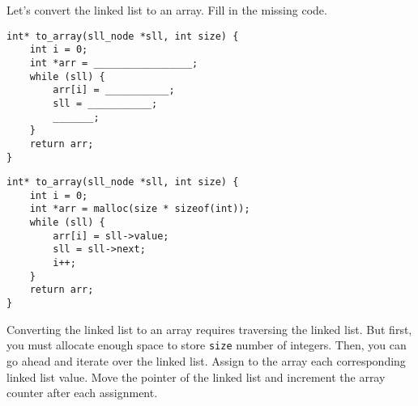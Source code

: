 \begin{blocksection}
\question
Let's convert the linked list to an array. Fill in the missing code.

\begin{verbatim}
int* to_array(sll_node *sll, int size) {
    int i = 0;
    int *arr = _________________;
    while (sll) {
        arr[i] = ___________;
        sll = ___________;
        _______;
    }
    return arr;
}
\end{verbatim}

\begin{solution}
\begin{verbatim}
int* to_array(sll_node *sll, int size) {
    int i = 0;
    int *arr = malloc(size * sizeof(int));
    while (sll) {
        arr[i] = sll->value;
        sll = sll->next;
        i++;
    }
    return arr;
}
\end{verbatim}

Converting the linked list to an array requires traversing the linked list. But first, you must allocate enough space to store \lstinline$size$ number of integers. Then, you can go ahead and iterate over the linked list. Assign to the array each corresponding linked list value. Move the pointer of the linked list and increment the array counter after each assignment.
\end{solution}
\end{blocksection}